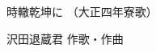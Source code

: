 \documentclass[10pt,b5j]{tarticle} %
\begin{document}
\begin{minipage}[c]{0.7\hsize} %
    \begin{center}
        {\LARGE
            時轍乾坤に %
        }
        {\small 
            （大正四年寮歌） %
        }
    \end{center}
\end{minipage}
\begin{minipage}[c]{0.3\hsize} %
    \begin{flushright} %
        沢田退蔵君 作歌・作曲 %
    \end{flushright}
\end{minipage}
\end{document}
